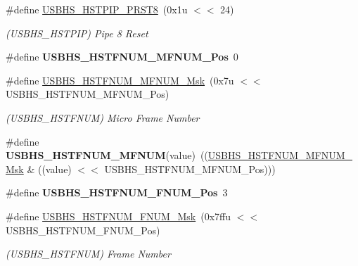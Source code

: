\begin{DoxyCompactItemize}
\#define \mbox{\hyperlink{group__SAMS70__USBHS_ga7da6e19c73db3010526a8d3a42c4d49e}{U\+S\+B\+H\+S\+\_\+\+H\+S\+T\+P\+I\+P\+\_\+\+P\+R\+S\+T8}}~(0x1u $<$$<$ 24)
\begin{DoxyCompactList}\small\item\em (U\+S\+B\+H\+S\+\_\+\+H\+S\+T\+P\+IP) Pipe 8 Reset \end{DoxyCompactList}\item 
\mbox{\label{group__SAMS70__USBHS_ga516a648997039419b7b87f9798b97c60}} 
\#define {\bfseries U\+S\+B\+H\+S\+\_\+\+H\+S\+T\+F\+N\+U\+M\+\_\+\+M\+F\+N\+U\+M\+\_\+\+Pos}~0
\item 
\mbox{\label{group__SAMS70__USBHS_gaa6eb63a90913102975022647c0b2af3d}} 
\#define \mbox{\hyperlink{group__SAMS70__USBHS_gaa6eb63a90913102975022647c0b2af3d}{U\+S\+B\+H\+S\+\_\+\+H\+S\+T\+F\+N\+U\+M\+\_\+\+M\+F\+N\+U\+M\+\_\+\+Msk}}~(0x7u $<$$<$ U\+S\+B\+H\+S\+\_\+\+H\+S\+T\+F\+N\+U\+M\+\_\+\+M\+F\+N\+U\+M\+\_\+\+Pos)
\begin{DoxyCompactList}\small\item\em (U\+S\+B\+H\+S\+\_\+\+H\+S\+T\+F\+N\+UM) Micro Frame Number \end{DoxyCompactList}\item 
\mbox{\label{group__SAMS70__USBHS_ga3704452b0f8c713899f51e0a7dc20342}} 
\#define {\bfseries U\+S\+B\+H\+S\+\_\+\+H\+S\+T\+F\+N\+U\+M\+\_\+\+M\+F\+N\+UM}(value)~((\mbox{\hyperlink{group__SAMV71__USBHS_gaa6eb63a90913102975022647c0b2af3d}{U\+S\+B\+H\+S\+\_\+\+H\+S\+T\+F\+N\+U\+M\+\_\+\+M\+F\+N\+U\+M\+\_\+\+Msk}} \& ((value) $<$$<$ U\+S\+B\+H\+S\+\_\+\+H\+S\+T\+F\+N\+U\+M\+\_\+\+M\+F\+N\+U\+M\+\_\+\+Pos)))
\item 
\mbox{\label{group__SAMS70__USBHS_gaca6d368cfde9f1c4c6efeba049f87619}} 
\#define {\bfseries U\+S\+B\+H\+S\+\_\+\+H\+S\+T\+F\+N\+U\+M\+\_\+\+F\+N\+U\+M\+\_\+\+Pos}~3
\item 
\mbox{\label{group__SAMS70__USBHS_ga12d53a196a1de6bf54b6a602413ee6ba}} 
\#define \mbox{\hyperlink{group__SAMS70__USBHS_ga12d53a196a1de6bf54b6a602413ee6ba}{U\+S\+B\+H\+S\+\_\+\+H\+S\+T\+F\+N\+U\+M\+\_\+\+F\+N\+U\+M\+\_\+\+Msk}}~(0x7ffu $<$$<$ U\+S\+B\+H\+S\+\_\+\+H\+S\+T\+F\+N\+U\+M\+\_\+\+F\+N\+U\+M\+\_\+\+Pos)
\begin{DoxyCompactList}\small\item\em (U\+S\+B\+H\+S\+\_\+\+H\+S\+T\+F\+N\+UM) Frame Number \end{DoxyCompactList}\item 

\end{DoxyCompactItemize}
